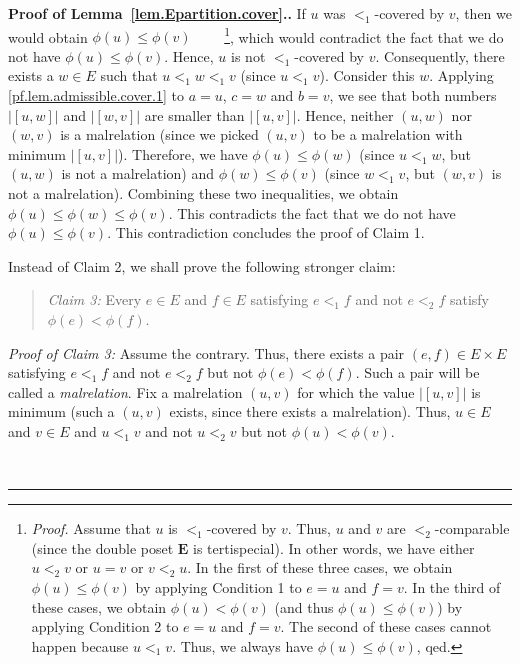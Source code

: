 \documentclass[numbers=enddot,12pt,final,onecolumn,notitlepage,abstracton]{scrartcl}
\theoremstyle{definition}
\newenvironment{statement}{\begin{quote}}{\end{quote}}
\newenvironment{proof}[1][Proof]{\noindent\textbf{#1.} }{\ \rule{0.5em}{0.5em}}
\newcommand{\EE}{{\mathbf{E}}}
\begin{document}
\begin{proof}[Proof of Lemma~\ref{lem.Epartition.cover}.]
If $u$ was $<_1$-covered by $v$, then we would obtain
$\phi\left(u\right) \leq \phi\left(v\right)$
\ \ \ \ \footnote{\textit{Proof.} Assume that $u$ is
$<_1$-covered by $v$. Thus, $u$ and $v$ are $<_2$-comparable
(since the double poset $\EE$ is tertispecial). In other words,
we have either $u <_2 v$ or $u = v$ or $v <_2 u$. In the
first of these three cases, we obtain
$\phi\left(u\right) \leq \phi\left(v\right)$ by applying
Condition 1 to $e = u$ and $f = v$. In the third of these
cases, we obtain
$\phi\left(u\right) < \phi\left(v\right)$ (and thus
$\phi\left(u\right) \leq \phi\left(v\right)$) 
by applying Condition 2 to $e = u$ and $f = v$. The second
of these cases cannot happen because $u <_1 v$. Thus, we
always have $\phi\left(u\right) \leq \phi\left(v\right)$,
qed.}, which would
contradict the fact that we do not have
$\phi\left(u\right) \leq \phi\left(v\right)$. Hence, $u$ is not
$<_1$-covered by $v$. Consequently, there exists a $w \in E$
such that $u <_1 w <_1 v$ (since $u <_1 v$). Consider this
$w$. Applying \eqref{pf.lem.admissible.cover.1} to $a = u$,
$c = w$ and $b = v$, we see that both numbers
$\left|\left[u, w\right]\right|$ and
$\left|\left[w, v\right]\right|$ are smaller than
$\left|\left[u, v\right]\right|$. Hence, neither
$\left(u, w\right)$ nor $\left(w, v\right)$ is a malrelation
(since we picked $\left(u, v\right)$ to be a malrelation with
minimum $\left|\left[u, v\right]\right|$). Therefore, we have
$\phi\left(u\right) \leq \phi\left(w\right)$ (since $u <_1 w$,
but $\left(u, w\right)$ is not a malrelation) and
$\phi\left(w\right) \leq \phi\left(v\right)$ (since $w <_1 v$,
but $\left(w, v\right)$ is not a malrelation).
Combining these two inequalities, we obtain
$\phi\left(u\right) \leq \phi\left(w\right)
\leq \phi\left(v\right)$. This contradicts
the fact that we do not have
$\phi\left(u\right) \leq \phi\left(v\right)$. This contradiction
concludes the proof of Claim 1.

Instead of Claim 2, we shall prove the following stronger claim:

\begin{statement}
\textit{Claim 3:} Every $e \in E$ and $f \in E$ satisfying
$e <_1 f$ and not $e <_2 f$ satisfy
$\phi\left(e\right) < \phi\left(f\right)$.
\end{statement}

\textit{Proof of Claim 3:} Assume the contrary. Thus, there
exists a pair $\left(e, f\right) \in E \times E$ satisfying
$e <_1 f$ and not $e <_2 f$ but not
$\phi\left(e\right) < \phi\left(f\right)$.
Such a pair will be called a \textit{malrelation}. Fix a
malrelation $\left(u, v\right)$ for which the value
$\left|\left[u, v\right]\right|$ is minimum (such a
$\left(u, v\right)$ exists, since there exists a malrelation).
Thus, $u \in E$ and $v \in E$ and $u <_1 v$ and not $u <_2 v$
but not $\phi\left(u\right) < \phi\left(v\right)$.


\end{proof}
\end{document}
